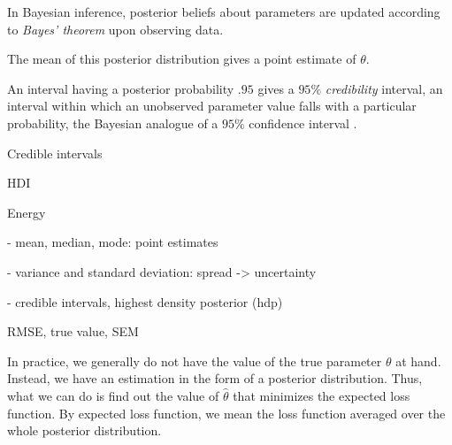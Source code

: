 
In Bayesian inference, posterior beliefs about parameters are updated according to \textit{Bayes' theorem} upon observing data.  

The mean of this posterior distribution gives a point estimate of $\theta$. 

An interval having a posterior probability $.95$ gives a $95\%$ \textit{credibility} interval, an interval within which an unobserved parameter value falls with a particular probability, the Bayesian analogue of a $95\%$ confidence interval \cite[p. 777]{STK}.

Credible intervals 

HDI 

Energy

- mean, median, mode: point estimates

- variance and standard deviation: spread -> uncertainty 

- credible intervals, highest density posterior (hdp) 


RMSE, true value, SEM 

In practice, we generally do not have the value of the true parameter $\theta$ at hand. Instead, we have an estimation in the form of a posterior distribution. Thus, what we can do is find out the value of $\hat{\theta}$ that minimizes the expected loss function. By expected loss function, we mean the loss function averaged over the whole posterior distribution. 









